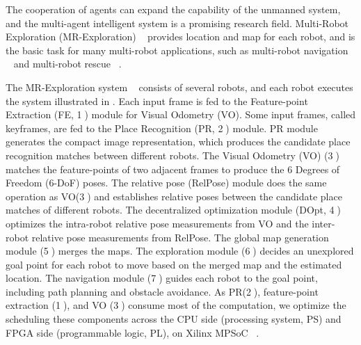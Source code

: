 \label{sec:intro}

The cooperation of agents can expand the capability of the unmanned system, and the multi-agent intelligent system is a promising research field.
Multi-Robot Exploration (MR-Exploration)  ~\cite{corah2019communication} provides location and map for each robot, and is the basic task for many multi-robot applications, such as multi-robot navigation  ~\cite{tanner2005towards} and multi-robot rescue  ~\cite{baxter2007multi}.

The  MR-Exploration system  ~\cite{corah2019communication, cieslewski2018data} consists of several robots, and each robot executes the system illustrated in . Each input frame is fed to the Feature-point Extraction (FE, \textcircled{1}) module for Visual Odometry (VO). 
Some input frames, called keyframes, are fed to the Place Recognition (PR, \textcircled{2}) module.
PR module generates the compact image representation, which produces the candidate place recognition matches between different robots. The Visual Odometry (VO) (\textcircled{3}) matches the feature-points of two adjacent frames to produce the 6 Degrees of Freedom (6-DoF) poses. 
The relative pose (RelPose) module does the same operation as VO(\textcircled{3}) and establishes relative poses between the candidate place matches of different robots. The decentralized optimization module (DOpt, \textcircled{4}) optimizes the intra-robot relative pose measurements from VO and the inter-robot relative pose measurements from RelPose. The global map generation module (\textcircled{5}) merges the maps. The exploration module (\textcircled{6}) decides an unexplored goal point for each robot to move based on the merged map and the estimated location. The navigation module (\textcircled{7}) guides each robot to the goal point, including path planning and obstacle avoidance.
As PR(\textcircled{2}), feature-point extraction (\textcircled{1}), and VO (\textcircled{3}) consume most of the computation, we optimize the scheduling these components across the CPU side (processing system, PS) and FPGA side (programmable logic, PL), on Xilinx MPSoC  ~\cite{MPSoC}.

